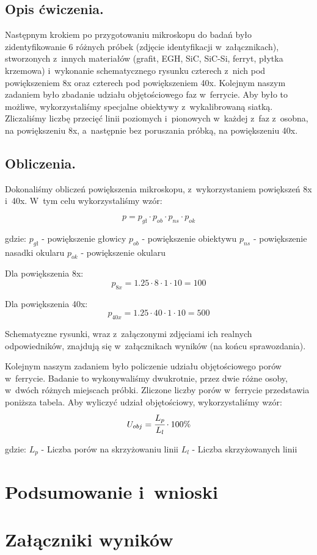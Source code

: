 \subsection{Opis ćwiczenia.}

Następnym krokiem po przygotowaniu mikroskopu do badań było zidentyfikowanie 6 różnych próbek (zdjęcie identyfikacji w~załącznikach), stworzonych z~innych materiałów (grafit, EGH, SiC, SiC-Si, ferryt, płytka krzemowa) i~wykonanie schematycznego rysunku czterech z~nich pod powiększeniem 8x oraz czterech pod powiększeniem 40x. Kolejnym naszym zadaniem było zbadanie udziału objętościowego faz w~ferrycie. Aby było to możliwe, wykorzystaliśmy specjalne obiektywy z~wykalibrowaną siatką. 
Zliczaliśmy liczbę przecięć linii poziomych i~pionowych w~każdej z~faz z~osobna, na powiększeniu 8x, a~następnie bez poruszania próbką, na powiększeniu 40x.

\subsection{Obliczenia.}

Dokonaliśmy obliczeń powiększenia mikroskopu, z~wykorzystaniem powiększeń 8x i~40x. W~tym celu wykorzystaliśmy wzór:

$$p=p_{gł}\cdot p_{ob}\cdot p_{ns}\cdot p_{ok}$$

gdzie:
\newline
$p_{gł}$ - powiększenie głowicy
\newline
$p_{ob}$ - powiększenie obiektywu
\newline
$p_{ns}$ - powiększenie nasadki okularu
\newline
$p_{ok}$ - powiększenie okularu
\newline

Dla powiększenia 8x: 
$$p_{8x}=1.25\cdot 8\cdot 1\cdot 10=100$$

Dla powiększenia 40x:
$$p_{40x}=1.25\cdot 40\cdot 1\cdot 10=500$$

Schematyczne rysunki, wraz z~załączonymi zdjęciami ich realnych odpowiedników, znajdują się w~załącznikach wyników (na końcu sprawozdania).
\newline

Kolejnym naszym zadaniem było policzenie udziału objętościowego porów w~ferrycie. Badanie to wykonywaliśmy dwukrotnie, przez dwie różne osoby, w~dwóch różnych miejscach próbki. Zliczone liczby porów w~ferrycie przedstawia poniższa tabela. Aby wyliczyć udział objętościowy, wykorzystaliśmy wzór:
$$U_{obj}=\cfrac{L_p}{L_l} \cdot 100\%$$
\newline

gdzie:
\newline
$L_p$ - Liczba porów na skrzyżowaniu linii
\newline
$L_l$ - Liczba skrzyżowanych linii




\section{Podsumowanie i~wnioski}

\section{Załączniki wyników}


